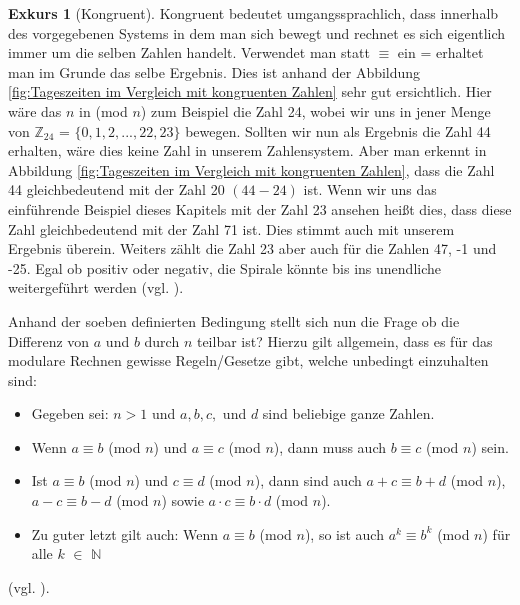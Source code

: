 \documentclass[12pt,a4paper]{article}
\theoremstyle{definition}
\newtheorem{exkurs}{Exkurs}
\begin{document}
\newpage
\begin{exkurs}[Kongruent]
Kongruent bedeutet umgangssprachlich, dass innerhalb des vorgegebenen Systems in dem man sich bewegt und rechnet es sich eigentlich immer um die selben Zahlen handelt.
Verwendet man statt $\equiv$ ein = erhaltet man im Grunde das selbe Ergebnis.
Dies ist anhand der Abbildung \ref{fig:Tageszeiten im Vergleich mit kongruenten Zahlen} sehr gut ersichtlich.
Hier wäre das $n$ in (mod $n$) zum Beispiel die Zahl 24, wobei wir uns in jener Menge von $\mathbb{Z}_{24}$ = $\{0, 1, 2, ..., 22, 23\}$ bewegen.
Sollten wir nun als Ergebnis die Zahl 44 erhalten, wäre dies keine Zahl in unserem Zahlensystem.
Aber man erkennt in Abbildung \ref{fig:Tageszeiten im Vergleich mit kongruenten Zahlen}, dass die Zahl 44 gleichbedeutend mit der Zahl 20 $(44-24)$ ist.
Wenn wir uns das einführende Beispiel dieses Kapitels mit der Zahl 23 ansehen heißt dies, dass diese Zahl gleichbedeutend mit der Zahl 71 ist.
Dies stimmt auch mit unserem Ergebnis überein.
Weiters zählt die Zahl 23 aber auch für die Zahlen 47, -1 und -25.
Egal ob positiv oder negativ, die Spirale könnte bis ins unendliche weitergeführt werden (vgl. \cite[298--299]{Meinel2011}).
\end{exkurs}

Anhand der soeben definierten Bedingung stellt sich nun die Frage ob die Differenz von $a$ und $b$ durch $n$ teilbar ist?
Hierzu gilt allgemein, dass es für das modulare Rechnen gewisse Regeln/Gesetze gibt, welche unbedingt einzuhalten sind:
\begin{itemize}
    \item Gegeben sei: $n>1$ und $a, b, c,$ und $d$ sind beliebige ganze Zahlen.
    \item Wenn $a\equiv b$ (mod $n$) und $a\equiv c$ (mod $n$), dann muss auch $b\equiv c$ (mod $n$) sein.
    \item Ist $a\equiv b$ (mod $n$) und $c\equiv d$ (mod $n$), dann sind auch $a + c\equiv b + d$ (mod $n$), $a - c\equiv b - d$ (mod $n$) sowie $a \cdot c\equiv b \cdot d$ (mod $n$).
    \item Zu guter letzt gilt auch: Wenn $a\equiv b$ (mod $n$), so ist auch $a^k\equiv b^k$ (mod $n$) für alle $k$ $\in$ $\mathbb{N}$
\end{itemize}
(vgl. \cite[66]{RempeGillen2009}).
\end{document}
